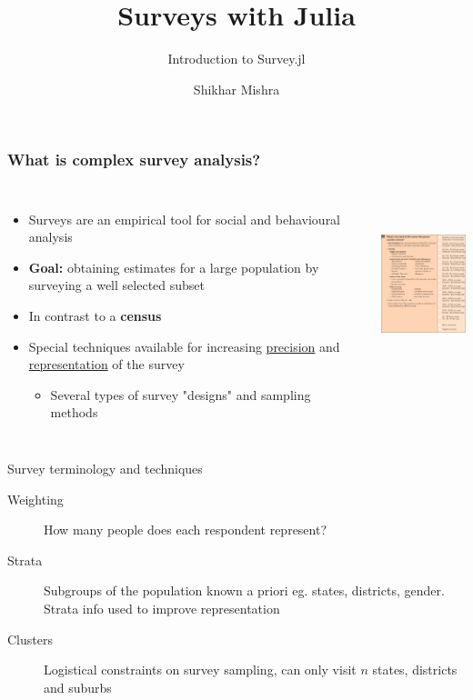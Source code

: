 \documentclass{beamer}          %
\title{Surveys with Julia}
\subtitle{Introduction to Survey.jl}
\author{Shikhar Mishra}
\begin{document}
\begin{frame}
  \titlepage
\end{frame}

\begin{frame}
  \frametitle{What is complex survey analysis?}
  \begin{columns}
           
  \begin{itemize}
  
  \item Surveys are an empirical tool for social and behavioural analysis
  \item \textbf{Goal:} obtaining estimates for a large population by surveying a well selected subset
  \item In contrast to a \textbf{census}
  \item Special techniques available for increasing \underline{precision} and \underline{representation} of the survey
   	\begin{itemize}
  		\item Several types of survey "designs" and sampling methods
  	\end{itemize} 
	\end{itemize}
	
	\centering
	\includegraphics[height=5cm, width=3.5cm]{Q38}
\end{columns}
\end{frame}

\begin{frame}{Survey terminology and techniques}
    \begin{description}
    \item[Weighting] How many people does each respondent represent?
    \item[Strata] Subgroups of the population known a priori eg. states, districts, gender. Strata info used to improve representation
    \item[Clusters] Logistical constraints on survey sampling, can only visit $n$ states, districts and suburbs
    \end{description}
\end{frame}
\end{document}

